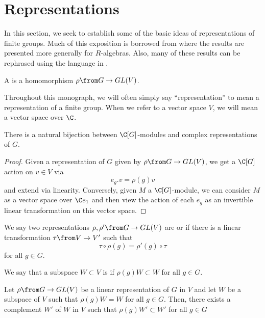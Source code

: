 \documentclass[11pt,leqno,oneside]{amsbook}
\numberwithin{thm}{section}
\begin{document}
\section{Representations}
In this section, we seek to establish some of the basic ideas of
representations of finite groups. Much of this exposition is borrowed
from \cite{etingof} where the results are presented more generally for
\(R\)-algebras. Also, many of these results can be rephrased using the
language in \cite{aw}.
\begin{defn}
  A  is a
  homomorphism \(\rho \from G \to GL(V)\).
\end{defn}
\begin{rmk}
  Throughout this monograph, we will often simply say
  ``representation'' to mean a representation of a finite group. When
  we refer to a vector space \(V\), we will mean a vector space over \(\C\).
\end{rmk}
\begin{thm}
  There is a natural bijection between \(\C[G]\)-modules and complex
  representations of \(G\).
\end{thm}
\begin{proof}
  Given a representation of \(G\) given by \(\rho \from G \to GL(V)\),
  we get a \(\C[G]\) action on \(v \in V\) via \[
    e_g.v = \rho(g)v
  \]
  and extend via linearity. Conversely, given \(M\) a
  \(\C[G]\)-module, we can consider \(M\) as 
  a vector space over \(\C e_1\) and then view the action of each
  \(e_g\) as an invertible linear transformation on this vector space.
\end{proof}
\begin{defn}
  We say two representations \(\rho, \rho' \from G \to GL(V)\) are
   or  if 
  there is a linear transformation \(\tau \from V \to V'\) such
  that \[
    \tau \circ \rho(g) = \rho'(g) \circ \tau
  \]
  for all \(g \in G\).
\end{defn}
\begin{defn}
  We say that a subspace \(W \subset V\) is  if
  \(\rho(g)W \subset W\) for all \(g \in G\).
\end{defn}
\begin{prop}
  Let \(\rho \from G \to GL(V)\) be a linear representation of \(G\)
  in \(V\) and let \(W\) be a subspace of \(V\) such that \(\rho(g)W =
  W\) for all \(g \in G\). Then, there exists a complement \(W'\) of
  \(W\) in \(V\) such that \(\rho(g)W' \subset W'\) for all \(g \in G\)
\end{prop}
\end{document}
